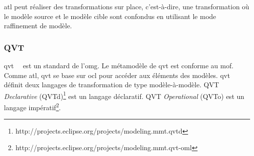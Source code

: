 \gls{atl} peut réaliser des transformations sur place, c'est-à-dire, une 
transformation où le modèle source et le modèle cible sont confondus en 
utilisant le mode raffinement de modèle. 


\subsubsection{QVT}
\gls{qvt}~\cite{kurtev2008state}~\cite{omg2011meta} est un standard de l'\gls{omg}. Le métamodèle de \gls{qvt} est conforme au \gls{mof}. Comme \gls{atl}, \gls{qvt} se base sur \gls{ocl} pour accéder aux éléments des modèles.
\gls{qvt} définit deux langages de transformation de type modèle-à-modèle. 
QVT \textit{Declarative} (QVTd)\footnote{http://projects.eclipse.org/projects/modeling.mmt.qvtd} est un langage déclaratif. QVT \textit{Operational} (QVTo) est un langage impératif\footnote{http://projects.eclipse.org/projects/modeling.mmt.qvt-oml}.


%
%

